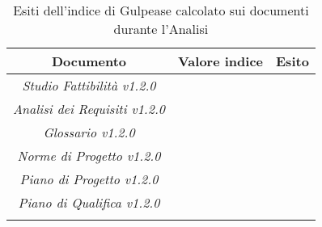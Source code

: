 \begin{longtable}{|c|p{3cm}|p{3cm}|}
\toprule
\textbf{Documento} & \textbf{Valore indice} & \textbf{Esito} \\


\midrule
\emph{Studio Fattibilità v1.2.0} & & \\
\midrule
\emph{Analisi dei Requisiti v1.2.0} & & \\
\midrule
\emph{Glossario v1.2.0} & & \\
\midrule
\emph{Norme di Progetto v1.2.0} & & \\
\midrule
\emph{Piano di Progetto v1.2.0} & & \\
\midrule
\emph{Piano di Qualifica v1.2.0} & & \\
\bottomrule
\caption{Esiti dell'indice di Gulpease calcolato sui documenti durante l'Analisi}
\label{tab:changelog}
\end{longtable}
















